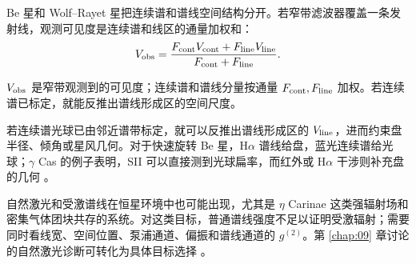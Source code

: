 Be 星和 Wolf--Rayet 星把连续谱和谱线空间结构分开。若窄带滤波器覆盖一条发射线，观测可见度是连续谱和线区的通量加权和：
\begin{equation}
  V_{\rm obs}=
  \frac{F_{\rm cont}V_{\rm cont}+F_{\rm line}V_{\rm line}}
       {F_{\rm cont}+F_{\rm line}} .
  \label{eq:ch10-line-visibility}
\end{equation}
\begin{formulaexplain}
\(V_{\rm obs}\) 是窄带观测到的可见度；连续谱和谱线分量按通量 \(F_{\rm cont},F_{\rm line}\) 加权。若连续谱已标定，就能反推出谱线形成区的空间尺度。
\end{formulaexplain}
若连续谱光球已由邻近谱带标定，就可以反推出谱线形成区的 \(V_{\rm line}\)，进而约束盘半径、倾角或星风几何。对于快速旋转 Be 星，H\(\alpha\) 谱线给盘，蓝光连续谱给光球；\(\gamma\) Cas 的例子表明，SII 可以直接测到光球扁率，而红外或 H\(\alpha\) 干涉则补充盘的几何 \citep{2025ApJ...995..191A}。

自然激光和受激谱线在恒星环境中也可能出现，尤其是 \(\eta\) Carinae 这类强辐射场和密集气体团块共存的系统。对这类目标，普通谱线强度不足以证明受激辐射；需要同时看线宽、空间位置、泵浦通道、偏振和谱线通道的 \(g^{(2)}\)。第 \ref{chap:09} 章讨论的自然激光诊断可转化为具体目标选择 \citep{2004A&A...428..497J,2005NewA...10..361J,2008AIPC..984..216D}。

